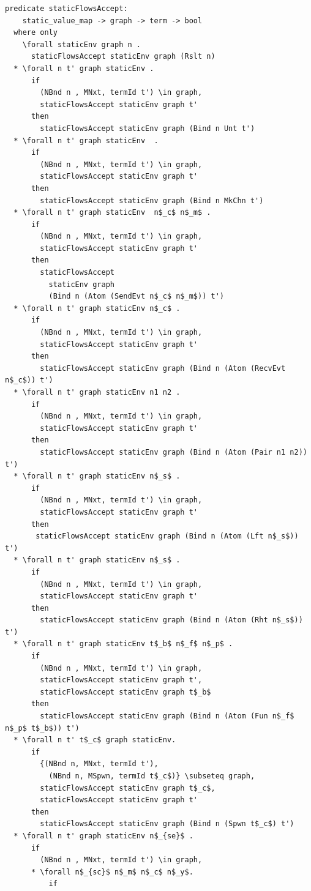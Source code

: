 \documentclass[letterpaper, 11pt]{extarticle}
\begin{document}
\begin{lstlisting}[language=logic, mathescape]
  predicate staticFlowsAccept:
    static_value_map -> graph -> term -> bool
  where only
    \forall staticEnv graph n .
      staticFlowsAccept staticEnv graph (Rslt n)
  * \forall n t' graph staticEnv .
      if
        (NBnd n , MNxt, termId t') \in graph,
        staticFlowsAccept staticEnv graph t'
      then
        staticFlowsAccept staticEnv graph (Bind n Unt t')
  * \forall n t' graph staticEnv  .
      if
        (NBnd n , MNxt, termId t') \in graph,
        staticFlowsAccept staticEnv graph t'
      then
        staticFlowsAccept staticEnv graph (Bind n MkChn t')
  * \forall n t' graph staticEnv  n$_c$ n$_m$ .
      if
        (NBnd n , MNxt, termId t') \in graph,
        staticFlowsAccept staticEnv graph t'
      then
        staticFlowsAccept
          staticEnv graph
          (Bind n (Atom (SendEvt n$_c$ n$_m$)) t')
  * \forall n t' graph staticEnv n$_c$ .
      if
        (NBnd n , MNxt, termId t') \in graph,
        staticFlowsAccept staticEnv graph t'
      then
        staticFlowsAccept staticEnv graph (Bind n (Atom (RecvEvt n$_c$)) t')
  * \forall n t' graph staticEnv n1 n2 .
      if
        (NBnd n , MNxt, termId t') \in graph,
        staticFlowsAccept staticEnv graph t'
      then
        staticFlowsAccept staticEnv graph (Bind n (Atom (Pair n1 n2)) t')
  * \forall n t' graph staticEnv n$_s$ .
      if
        (NBnd n , MNxt, termId t') \in graph,
        staticFlowsAccept staticEnv graph t'
      then
       staticFlowsAccept staticEnv graph (Bind n (Atom (Lft n$_s$)) t')
  * \forall n t' graph staticEnv n$_s$ .
      if
        (NBnd n , MNxt, termId t') \in graph,
        staticFlowsAccept staticEnv graph t'
      then
        staticFlowsAccept staticEnv graph (Bind n (Atom (Rht n$_s$)) t')
  * \forall n t' graph staticEnv t$_b$ n$_f$ n$_p$ .
      if
        (NBnd n , MNxt, termId t') \in graph,
        staticFlowsAccept staticEnv graph t',
        staticFlowsAccept staticEnv graph t$_b$
      then
        staticFlowsAccept staticEnv graph (Bind n (Atom (Fun n$_f$ n$_p$ t$_b$)) t')
  * \forall n t' t$_c$ graph staticEnv.
      if
        {(NBnd n, MNxt, termId t'),
          (NBnd n, MSpwn, termId t$_c$)} \subseteq graph,
        staticFlowsAccept staticEnv graph t$_c$,
        staticFlowsAccept staticEnv graph t'
      then
        staticFlowsAccept staticEnv graph (Bind n (Spwn t$_c$) t')
  * \forall n t' graph staticEnv n$_{se}$ .
      if
        (NBnd n , MNxt, termId t') \in graph,
      * \forall n$_{sc}$ n$_m$ n$_c$ n$_y$.
          if

\end{lstlisting}
\end{document}
